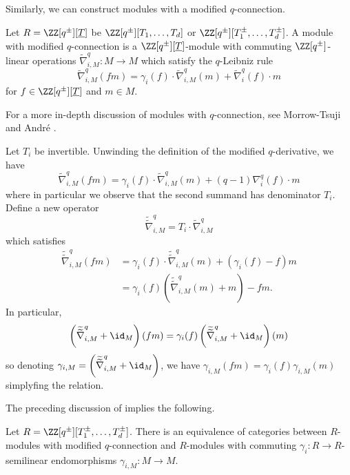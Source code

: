 Similarly, we can construct modules with a modified $q$-connection. 
\begin{definition}\label{def: modified q-connections on modules}
    Let $R=\ZZ[q^{\pm}][\underline{T}]$ be $\ZZ[q^{\pm}][T_{1},\dots,T_{d}]$ or $\ZZ[q^{\pm}][T_{1}^{\pm},\dots,T_{d}^{\pm}]$. A module with modified $q$-connection is a $\ZZ[q^{\pm}][\underline{T}]$-module with commuting $\ZZ[q^{\pm}]$-linear operations $\widetilde{\nabla}_{i,M}^{q}:M\to M$ which satisfy the $q$-Leibniz rule 
    $$\widetilde{\nabla}_{i,M}^{q}(fm)=\gamma_{i}(f)\cdot\widetilde{\nabla}_{i,M}^{q}(m)+\widetilde{\nabla}_{i}^{q}(f)\cdot m$$
    for $f\in \ZZ[q^{\pm}][\underline{T}]$ and $m\in M$.
\end{definition}
\begin{remark}
    For a more in-depth discussion of modules with $q$-connection, see Morrow-Tsuji \cite{MorrowTsuji} and Andr\'{e} \cite{Andre}.
\end{remark}
\begin{remark}\label{rmk: invertible case}
    Let $T_{i}$ be invertible. Unwinding the definition of the modified $q$-derivative, we have
    $$\widetilde{\nabla}_{i,M}^{q}(fm)=\gamma_{i}(f)\cdot\widetilde{\nabla}_{i,M}^{q}(m)+(q-1)\nabla_{i}^{q}(f)\cdot m$$
    where in particular we observe that the second summand has denominator $T_{i}$. Define a new operator 
    $$\widetilde{\widetilde{\nabla}}_{i,M}^{q}=T_{i}\cdot\widetilde{\nabla}_{i,M}^{q}$$
    which satisfies 
    \begin{align*}
        \widetilde{\widetilde{\nabla}}_{i,M}^{q}(fm) &= \gamma_{i}(f)\cdot\widetilde{\widetilde{\nabla}}_{i,M}^{q}(m)+(\gamma_{i}(f)-f)m \\
        &= \gamma_{i}(f)\left(\widetilde{\widetilde{\nabla}}_{i,M}^{q}(m)+m\right)-fm.
    \end{align*}
    In particular, 
    $$\left(\widetilde{\widetilde{\nabla}}_{i,M}^{q}+\id_{M}\right)(fm) = \gamma_{i}(f)\left(\widetilde{\widetilde{\nabla}}_{i,M}^{q}+\id_{M}\right)(m)$$
    so denoting $\gamma_{i,M}=\left(\widetilde{\widetilde{\nabla}}_{i,M}^{q}+\id_{M}\right)$, we have $\gamma_{i,M}(fm)=\gamma_{i}(f)\gamma_{i,M}(m)$ simplyfing the relation. 
\end{remark}
The preceding discussion of  implies the following. 
\begin{corollary}\label{corr: equivalence of q-connection modules and semilinear}
    Let $R=\ZZ[q^{\pm}][T_{1}^{\pm},\dots,T_{d}^{\pm}]$. There is an equivalence of categories between $R$-modules with modified $q$-connection and $R$-modules with commuting $\gamma_{i}:R\to R$-semilinear endomorphisms $\gamma_{i,M}:M\to M$. 
\end{corollary}
